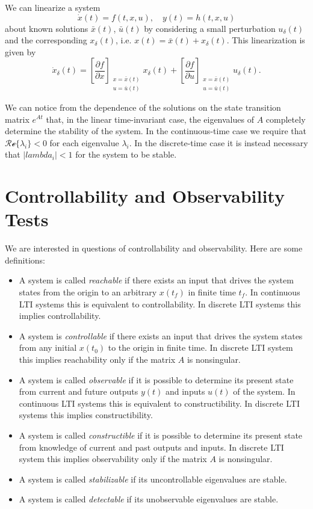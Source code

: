 \documentclass{report}
\begin{document}
We can linearize a system
$$
\dot{x}(t) = f(t, x, u), \quad
y(t) = h(t, x, u)
$$
about known solutions $\bar{x}(t)$,
$\bar{u}(t)$ by considering a small perturbation $u_\delta(t)$ and the
corresponding $x_\delta(t)$, i.e.
$x(t) = \bar{x}(t) + x_\delta(t)$. This linearization is given by
$$
\dot{x}_\delta(t) =
\left[\frac{\partial f}{\partial x}\right]
  _{\substack{x = \bar{x}(t) \\ u = \bar{u}(t)}}
x_\delta(t)
+
\left[\frac{\partial f}{\partial u}\right]
  _{\substack{x = \bar{x}(t) \\ u = \bar{u}(t)}}
u_\delta(t).
$$

We can notice from the dependence of the solutions on
the state transition matrix $e^{At}$ that, in the linear
time-invariant case, the eigenvalues of $A$
completely determine the stability of the system. In the
continuous-time case we require that
$\mathcal{Re}\{\lambda_i\} < 0$ for each eigenvalue $\lambda_i$. In
the discrete-time case it is instead necessary that
$|lambda_i| < 1$ for the system to be stable.

\section{Controllability and Observability Tests}

We are interested in questions of controllability and
observability. Here are some definitions:
\begin{itemize}
  \item{
    A system is called \emph{reachable} if there exists an input that
    drives the system states from the origin to an arbitrary $x(t_f)$
    in finite time $t_f$. In continuous LTI systems this is
    equivalent to controllability. In discrete LTI systems this
    implies controllability.
  }
  \item{
    A system is \emph{controllable} if there exists an input that
    drives the system states from any initial $x(t_0)$ to the origin
    in finite time. In discrete LTI system this implies reachability
    only if the matrix $A$ is nonsingular.
  }
  \item{
    A system is called \emph{observable} if it is possible to
    determine its present state from current and future outputs $y(t)$
    and inputs $u(t)$ of the system. In continuous LTI systems this is
    equivalent to constructibility. In discrete LTI systems this
    implies constructibility.
  }
  \item{
    A system is called \emph{constructible} if it is possible to
    determine its present state from knowledge of current and past
    outputs and inputs. In discrete LTI system this implies
    observability only if the matrix $A$ is nonsingular.
  }
  \item{
    A system is called \emph{stabilizable} if its uncontrollable
    eigenvalues are stable.
  }
  \item{
    A system is called \emph{detectable} if its unobservable
    eigenvalues are stable.
  }
\end{itemize}
\end{document}
